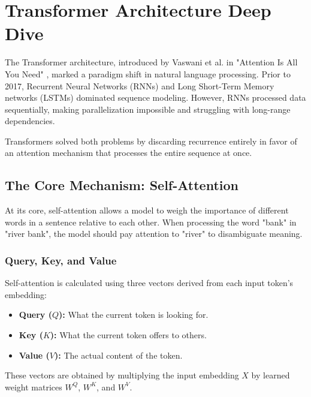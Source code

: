\chapter{Transformer Architecture Deep Dive}
\label{chap:transformers}

The Transformer architecture, introduced by Vaswani et al. in "Attention Is All You Need" \cite{vaswani2017attention}, marked a paradigm shift in natural language processing. Prior to 2017, Recurrent Neural Networks (RNNs) and Long Short-Term Memory networks (LSTMs) \cite{hochreiter1997long} dominated sequence modeling. However, RNNs processed data sequentially, making parallelization impossible and struggling with long-range dependencies.

Transformers solved both problems by discarding recurrence entirely in favor of an attention mechanism that processes the entire sequence at once.

\section{The Core Mechanism: Self-Attention}

At its core, self-attention allows a model to weigh the importance of different words in a sentence relative to each other. When processing the word "bank" in "river bank", the model should pay attention to "river" to disambiguate meaning.

\subsection{Query, Key, and Value}
Self-attention is calculated using three vectors derived from each input token's embedding:
\begin{itemize}
    \item \textbf{Query ($Q$):} What the current token is looking for.
    \item \textbf{Key ($K$):} What the current token offers to others.
    \item \textbf{Value ($V$):} The actual content of the token.
\end{itemize}

These vectors are obtained by multiplying the input embedding $X$ by learned weight matrices $W^Q$, $W^K$, and $W^V$.

